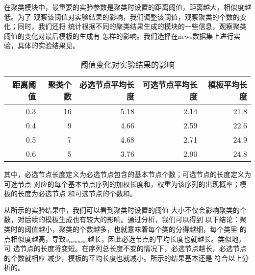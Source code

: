 在聚类模块中，最重要的实验参数是聚类时设置的距离阈值，距离越大，相似度越低。为了
观察该阈值对实验结果的影响，我们调整该阈值，观察聚类的个数的变化；同时，我们还将
统计根据不同的聚类结果生成的模块的一些信息，观察聚类阈值的变化对最后模板的生成有
怎样的影响。我们选择在news数据集上进行实验，具体的实验结果见。

\begin{table}[h]
\caption{阈值变化对实验结果的影响\label{experiment:tab:threshold}}
\begin{tabular}{rrrrr}
  \toprule
距离阈值 & 聚类个数 & 必选节点平均长度 & 可选节点平均长度 & 模板平均长度 \\
\hline
0.3 & 16 & 5.18 & 2.14 & 21.8 \\
0.4 & 9 & 4.66 & 2.59 & 22.6 \\
0.5 & 7 & 4.68 & 2.71 & 24.9 \\
0.6 & 5 & 3.76 & 2.90 & 24.8 \\
\bottomrule
\end{tabular}
\end{table}
\begin{comment}
#+ORGTBL: SEND 阈值变化 orgtbl-to-latex :splice nil :skip 0
| 距离阈值 | 聚类个数 | 必选节点平均长度 | 可选节点平均长度 | 模板平均长度 |
|----------+----------+------------------+------------------+--------------|
|      0.3 |       16 |             5.18 |             2.14 |         21.8 |
|      0.4 |        9 |             4.66 |             2.59 |         22.6 |
|      0.5 |        7 |             4.68 |             2.71 |         24.9 |
|      0.6 |        5 |             3.76 |             2.90 |         24.8 |
\end{comment}

其中，必选节点长度定义为必选节点包含的基本节点个数；可选节点的长度定义为可选节点
对应的每个基本节点序列的加权长度和，权重为该序列的出现概率；模板的长度为必选节点
和可选节点的个数和。

从所示的实验结果中，我们可以看到聚类时设置的阈值
大小不仅会影响聚类的个数，对后续的模板生成也有较大的影响。通过分析，我们可以得到
以下结论：聚类时的阈值越小，聚类的个数越多，也就意味着每个类的分得越细，每个类里
的点相似度越高，导致$s_{common}$越长，因此必选节点的平均长度也就越长。类似地，可
选节点的长度将变短。在序列总长度不变的情况下，必选节点越长，必选节点的个数就相应
减少，模板的平均长度也就减小。所示的结果基本还是
符合以上分析的。

